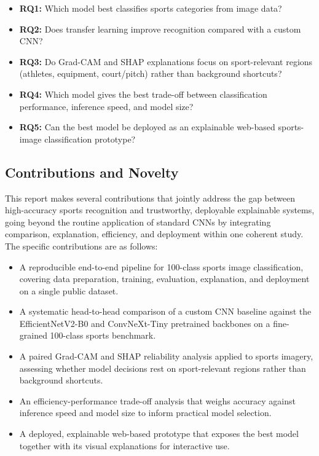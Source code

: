 \begin{itemize}
  \item \textbf{RQ1:} Which model best classifies sports categories from image data?
  \item \textbf{RQ2:} Does transfer learning improve recognition compared with a custom CNN?
  \item \textbf{RQ3:} Do Grad-CAM and SHAP explanations focus on sport-relevant regions (athletes, equipment, court/pitch) rather than background shortcuts?
  \item \textbf{RQ4:} Which model gives the best trade-off between classification performance, inference speed, and model size?
  \item \textbf{RQ5:} Can the best model be deployed as an explainable web-based sports-image classification prototype?
\end{itemize}

\subsection{Contributions and Novelty}
\label{sec:intro-contributions}

This report makes several contributions that jointly address the gap between high-accuracy sports recognition and trustworthy, deployable explainable systems, going beyond the routine application of standard CNNs by integrating comparison, explanation, efficiency, and deployment within one coherent study.
The specific contributions are as follows:

\begin{itemize}
  \item A reproducible end-to-end pipeline for 100-class sports image classification, covering data preparation, training, evaluation, explanation, and deployment on a single public dataset.
  \item A systematic head-to-head comparison of a custom CNN baseline against the EfficientNetV2-B0 and ConvNeXt-Tiny pretrained backbones on a fine-grained 100-class sports benchmark.
  \item A paired Grad-CAM and SHAP reliability analysis applied to sports imagery, assessing whether model decisions rest on sport-relevant regions rather than background shortcuts.
  \item An efficiency-performance trade-off analysis that weighs accuracy against inference speed and model size to inform practical model selection.
  \item A deployed, explainable web-based prototype that exposes the best model together with its visual explanations for interactive use.
\end{itemize}

